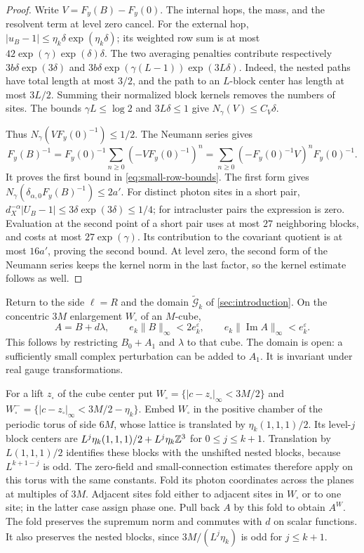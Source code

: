 \begin{proof}
Write $V=F_y(B)-F_y(0)$. The internal hops, the mass, and the
resolvent term at level zero cancel. For the external hop,
$|u_B-1|\le\eta_k\delta\exp(\eta_k\delta)$; its weighted row sum
is at most $42\exp(\gamma)\exp(\delta)\delta$. The two averaging
penalties contribute respectively
$3b\delta\exp(3\delta)$ and
$3b\delta\exp(\gamma(L-1))\exp(3L\delta)$. Indeed, the nested paths
have total length at most $3/2$, and the path to an $L$-block center
has length at most $3L/2$. Summing their normalized block kernels
removes the numbers of sites. The bounds $\gamma L\le\log2$ and
$3L\delta\le1$ give $N_\gamma(V)\le C_V\delta$.

Thus $N_\gamma(VF_y(0)^{-1})\le1/2$. The Neumann series gives
\[
 F_y(B)^{-1}=F_y(0)^{-1}
                  \sum_{n\ge0}(-VF_y(0)^{-1})^n
             =\sum_{n\ge0}(-F_y(0)^{-1}V)^nF_y(0)^{-1}.
\]
It proves the first bound in \eqref{eq:small-row-bounds}. The first
form gives $N_\gamma(\delta_{\alpha,0}F_y(B)^{-1})\le2a'$.
For distinct photon sites in a short pair,
$d_X^{-\alpha}|U_B-1|\le3\delta\exp(3\delta)\le1/4$;
for intracluster pairs the expression is zero. Evaluation at the
second point of a short pair uses at most $27$ neighboring blocks,
and costs at most $27\exp(\gamma)$. Its contribution to the covariant
quotient is at most $16a'$, proving the second bound. At level zero,
the second form of the Neumann series keeps the kernel norm in the
last factor, so the kernel estimate follows as well.
\end{proof}

Return to the side $\ell=R$ and the domain
$\widetilde{\mathcal G}_k$ of \cref{sec:introduction}.
On the concentric $3M$ enlargement $W_\square$ of an $M$-cube,
\begin{equation}\label{eq:local-small-gauge}
 A=B+d\lambda,\qquad e_k\|B\|_\infty<2e_k^\varepsilon,
 \qquad e_k\|\operatorname{Im}A\|_\infty<e_k^\varepsilon.
\end{equation}
This follows by restricting $B_0+A_1$ and $\lambda$ to that cube.
The domain is open: a sufficiently small complex perturbation can be
added to $A_1$. It is invariant under real gauge transformations.

For a lift $z_\square$ of the cube center put
$W_\square=\{|c-z_\square|_\infty<3M/2\}$ and
$W_\square^-=\{|c-z_\square|_\infty<3M/2-\eta_k\}$.
Embed $W_\square$ in the positive chamber of the periodic torus of
side $6M$, whose lattice is translated by $\eta_k(1,1,1)/2$.
Its level-$j$ block centers are
$L^j\eta_k(1,1,1)/2+L^j\eta_k\mathbb Z^3$ for $0\le j\le k+1$.
Translation by $L(1,1,1)/2$ identifies these blocks with the
unshifted nested blocks, because $L^{k+1-j}$ is odd. The zero-field
and small-connection estimates therefore apply on this torus with
the same constants.
Fold its photon coordinates across the planes at multiples of $3M$.
Adjacent sites fold either to adjacent sites in $W_\square$ or to
one site; in the latter case assign phase one. Pull back $A$ by this
fold to obtain $A^W$. The fold preserves the supremum norm and
commutes with $d$ on scalar functions. It also preserves the nested
blocks, since $3M/(L^j\eta_k)$ is odd for $j\le k+1$.

